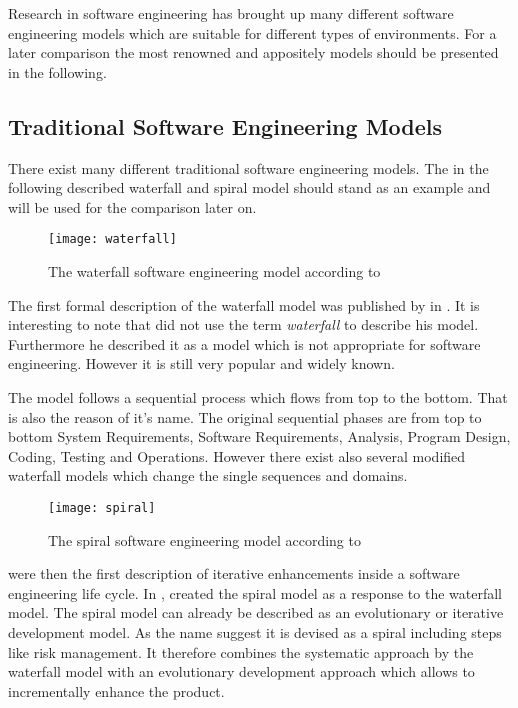 Research in software engineering has brought up many different software
engineering models which are suitable for different types of environments. For
a later comparison the most renowned and appositely models should be presented
in the following.

\subsection{Traditional Software Engineering Models} %

There exist many different traditional software engineering models. The in the
following described waterfall and spiral model should stand as an example and
will be used for the comparison later on.

\begin{figure}[htbp]
  \centering
  \texttt{[image: waterfall]}
  \caption{The waterfall software engineering model according to \textcite{Royce1970}}
\end{figure}

The first formal description of the waterfall model was published by
\textcite{Royce1970} in \citeyear{Royce1970}. It is interesting to note that
\citeauthor{Royce1970} did not use the term \emph{waterfall} to describe his
model. Furthermore he described it as a model which is not appropriate for
software engineering. However it is still very popular and widely known.

The model follows a sequential process which flows from top to the bottom. That
is also the reason of it's name. The original sequential phases are from top to
bottom System Requirements, Software Requirements, Analysis, Program Design,
Coding, Testing and Operations. However there exist also several modified
waterfall models which change the single sequences and domains.

\begin{figure}[htbp]
  \centering
  \texttt{[image: spiral]}
  \caption{The spiral software engineering model according to \textcite{Boehm1988}}
\end{figure}

\textcite{Basili1975} were then the first description of iterative enhancements
inside a software engineering life cycle. In \citeyear{Boehm1988},
\textcite{Boehm1988} created the spiral model as a response to the waterfall
model. The spiral model can already be described as an evolutionary or
iterative development model. As the name suggest it is devised as a spiral
including steps like risk management. It therefore combines the systematic
approach by the waterfall model with an evolutionary development approach which
allows to incrementally enhance the product.

